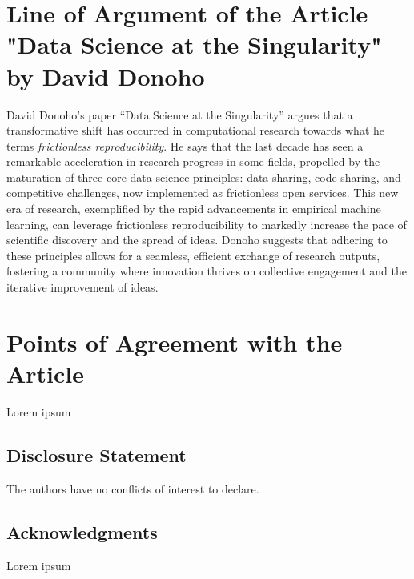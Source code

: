 \documentclass[]{hdsr}
\begin{document}
\section{Line of Argument of the Article "Data Science at the Singularity" by David Donoho}
\label{intro}
David Donoho's paper ``Data Science at the Singularity'' argues that a transformative shift has occurred in computational research towards what he terms \emph{frictionless reproducibility}. He says that the last decade has seen a remarkable acceleration in research progress in some fields, propelled by the maturation of three core data science principles: data sharing, code sharing, and competitive challenges, now implemented as frictionless open services. This new era of research, exemplified by the rapid advancements in empirical machine learning, can leverage frictionless reproducibility to markedly increase the pace of scientific discovery and the spread of ideas. Donoho suggests that adhering to these principles allows for a seamless, efficient exchange of research outputs, fostering a community where innovation thrives on collective engagement and the iterative improvement of ideas.





\restoregeometry
{}

\section{Points of Agreement with the Article}
Lorem ipsum 




\subsection*{Disclosure Statement}
The authors have no conflicts of interest to declare.

\subsection*{Acknowledgments}
Lorem ipsum 
 










\printbibliography
\end{document}
